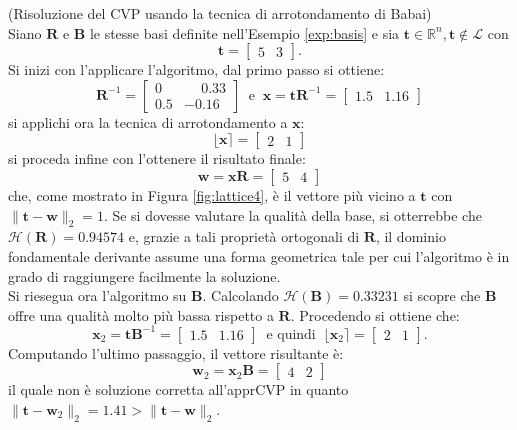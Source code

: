 \begin{exmp} (Risoluzione del CVP usando la tecnica di arrotondamento di Babai)
    \label{exp:babai}
    \\
    Siano $\mathbf{R}$ e $\mathbf{B}$ le stesse basi definite nell'Esempio \ref{exp:basis} 
    e sia $\mathbf{t} \in \mathbb{R}^n, \mathbf{t} \notin \mathcal{L}$ con
    \[
        \mathbf{t} =
        \begin{bmatrix}
            5 & 3
        \end{bmatrix}.
    \]
    Si inizi con l'applicare l'algoritmo, dal primo passo si ottiene:
    \[
        \mathbf{R}^{-1} =
        \begin{bmatrix}
            0 & \phantom{-}0.33\\
            0.5 & -0.16
        \end{bmatrix}
        \ \text{ e } \ \mathbf{x} = \mathbf{t}\mathbf{R}^{-1} = 
        \begin{bmatrix}
            1.5 & 1.16
        \end{bmatrix}
    \]
    si applichi ora la tecnica di arrotondamento a $\mathbf{x}$:
    \[
        \lfloor\mathbf{x}\rceil = 
        \begin{bmatrix}
            2 & 1
        \end{bmatrix}
    \]
    si proceda infine con l'ottenere il risultato finale:
    \[
        \mathbf{w} = \mathbf{x}\mathbf{R} =
        \begin{bmatrix}
            5 & 4
        \end{bmatrix}
    \]  
    che, come mostrato in Figura \ref{fig:lattice4}, è il vettore più vicino
    a $\mathbf{t}$ con $\|\mathbf{t}-\mathbf{w}\|_2 = 1$. Se si dovesse valutare la qualità della base, si otterrebbe che 
    $\mathcal{H}(\mathbf{R}) = 0.94574$ e, grazie a tali proprietà ortogonali di $\mathbf{R}$,
    il dominio fondamentale derivante assume una forma geometrica tale per cui
    l'algoritmo è in grado di raggiungere facilmente la soluzione.
    \\
    Si riesegua ora l'algoritmo su $\mathbf{B}$. Calcolando $\mathcal{H}(\mathbf{B}) = 0.33231$ 
    si scopre che $\mathbf{B}$ offre una qualità molto più bassa rispetto a $\mathbf{R}$. 
    Procedendo si ottiene che:
    \[
    \mathbf{x}_2 = \mathbf{t}\mathbf{B}^{-1}=
    \begin{bmatrix}
        1.5 & 1.16
    \end{bmatrix}
    \ \text{ e quindi } \ \lfloor\mathbf{x}_2\rceil = 
    \begin{bmatrix}
        2 & 1
    \end{bmatrix}.
    \]
    Computando l'ultimo passaggio, il vettore risultante è:
    \[
        \mathbf{w}_2 = \mathbf{x}_2\mathbf{B} =
        \begin{bmatrix}
            4 & 2
        \end{bmatrix}
    \]
    il quale non è soluzione corretta all'apprCVP in quanto 
    $\|\mathbf{t}-\mathbf{w}_2\|_2 = 1.41 > \|\mathbf{t}-\mathbf{w}\|_2$. 
\end{exmp}
